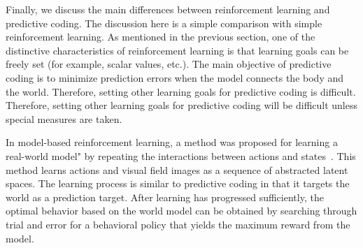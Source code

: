 Finally, we discuss the main differences between reinforcement learning and predictive coding. The discussion here is a simple comparison with simple reinforcement learning. As mentioned in the previous section, one of the distinctive characteristics of reinforcement learning is that learning goals can be freely set (for example, scalar values, etc.). The main objective of predictive coding is to minimize prediction errors when the model connects the body and the world. Therefore, setting other learning goals for predictive coding is difficult. Therefore, setting other learning goals for predictive coding will be difficult unless special measures are taken.


In model-based reinforcement learning, a method was proposed for learning a real-world model" by repeating the interactions between actions and states~\cite{Ha2018world}. This method learns actions and visual field images as a sequence of abstracted latent spaces. The learning process is similar to predictive coding in that it targets the world as a prediction target. After learning has progressed sufficiently, the optimal behavior based on the world model can be obtained by searching through trial and error for a behavioral policy that yields the maximum reward from the model.


